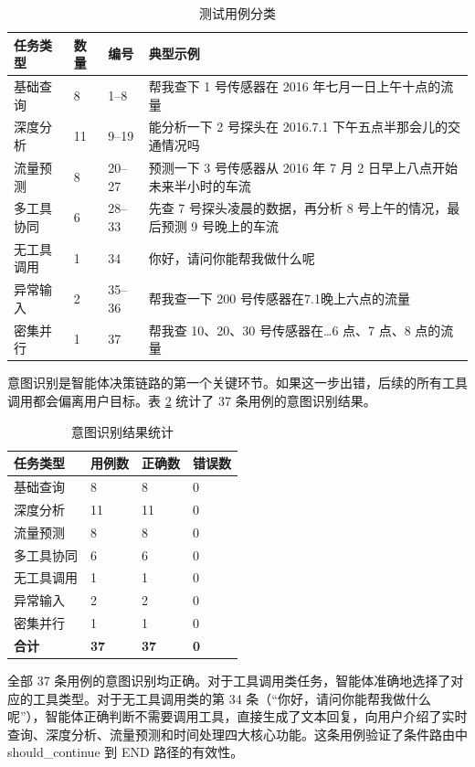 \begin{table}[!htbp]
\centering
\caption{测试用例分类}
\label{tab:test-cases}
\begin{tabular}{p{2.2cm}p{0.8cm}p{1cm}p{9cm}}
\hline
\textbf{任务类型} & \textbf{数量} & \textbf{编号} & \textbf{典型示例} \\
\hline
基础查询 & 8 & 1–8 & 帮我查下 1 号传感器在 2016 年七月一日上午十点的流量 \\
深度分析 & 11 & 9–19 & 能分析一下 2 号探头在 2016.7.1 下午五点半那会儿的交通情况吗 \\
流量预测 & 8 & 20–27 & 预测一下 3 号传感器从 2016 年 7 月 2 日早上八点开始未来半小时的车流 \\
多工具协同 & 6 & 28–33 & 先查 7 号探头凌晨的数据，再分析 8 号上午的情况，最后预测 9 号晚上的车流 \\
无工具调用 & 1 & 34 & 你好，请问你能帮我做什么呢 \\
异常输入 & 2 & 35–36 & 帮我查一下 200 号传感器在7.1晚上六点的流量 \\
密集并行 & 1 & 37 & 帮我查 10、20、30 号传感器在\ldots 6 点、7 点、8 点的流量 \\
\hline
\end{tabular}
\end{table}

意图识别是智能体决策链路的第一个关键环节。如果这一步出错，后续的所有工具调用都会偏离用户目标。表 \ref{tab:intent-accuracy} 统计了 37 条用例的意图识别结果。

\begin{table}[!htbp]
\centering
\caption{意图识别结果统计}
\label{tab:intent-accuracy}
\begin{tabular}{p{3.5cm}p{1.5cm}p{1.5cm}p{1.5cm}}
\toprule
\textbf{任务类型} & \textbf{用例数} & \textbf{正确数} & \textbf{错误数} \\
\midrule
基础查询 & 8 & 8 & 0 \\
深度分析 & 11 & 11 & 0 \\
流量预测 & 8 & 8 & 0 \\
多工具协同 & 6 & 6 & 0 \\
无工具调用 & 1 & 1 & 0 \\
异常输入 & 2 & 2 & 0 \\
密集并行 & 1 & 1 & 0 \\
\midrule
\textbf{合计} & \textbf{37} & \textbf{37} & \textbf{0} \\
\bottomrule
\end{tabular}
\end{table}

全部 37 条用例的意图识别均正确。对于工具调用类任务，智能体准确地选择了对应的工具类型。对于无工具调用类的第 34 条（“你好，请问你能帮我做什么呢”），智能体正确判断不需要调用工具，直接生成了文本回复，向用户介绍了实时查询、深度分析、流量预测和时间处理四大核心功能。这条用例验证了条件路由中 should\_continue 到 END 路径的有效性。

